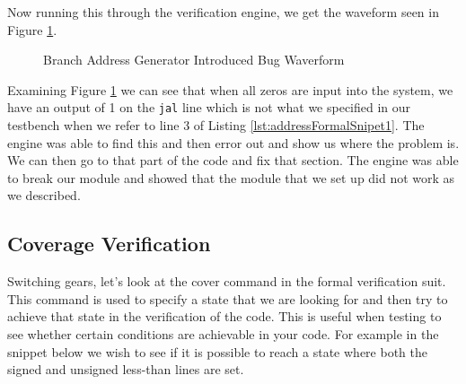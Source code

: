 \documentclass[
    a4paper, %
	12pt, %
    ]{CSSullivanBusinessReport}
\begin{document}
\begin{fullwidth}


Now running this through the verification engine, we get the waveform seen in Figure \ref{fig:addressBug}.

\begin{figure}[H]
    \centering
    \captionsetup{style=widetable}
    \caption{Branch Address Generator Introduced Bug Waverform}
    \label{fig:addressBug}
\end{figure}

Examining Figure \ref{fig:addressBug} we can see that when all zeros are input into the system, we have an output of 1 on the \verb|jal| line which is not what we specified in our testbench when we refer to line 3 of Listing \ref{lst:addressFormalSnipet1}. The engine was able to find this and then error out and show us where the problem is. We can then go to that part of the code and fix that section. The engine was able to break our module and showed that the module that we set up did not work as we described.


\captionsetup{style=widetable}
\subsection{Coverage Verification} %
Switching gears, let's look at the cover command in the formal verification suit. This command is used to specify a state that we are looking for and then try to achieve that state in the verification of the code. This is useful when testing to see whether certain conditions are achievable in your code. For example in the snippet below we wish to see if it is possible to reach a state where both the signed and unsigned less-than lines are set. 



\end{fullwidth}
\end{document}
